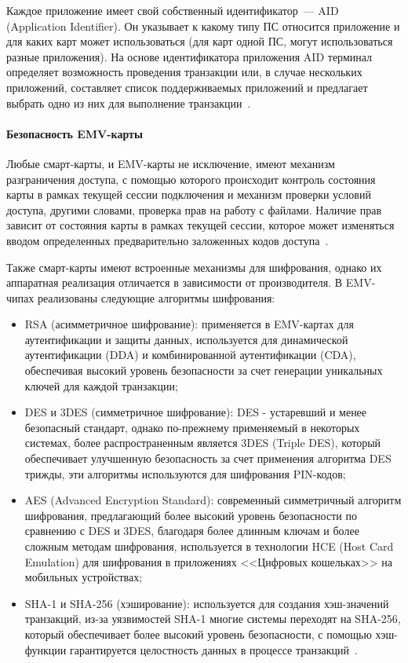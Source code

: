 Каждое приложение имеет свой собственный идентификатор~--- AID (Application Identifier).
Он указывает к какому типу ПС относится приложение и для каких карт может использоваться (для карт одной ПС, могут использоваться разные приложения).
На основе идентификатора приложения AID терминал определяет возможность проведения транзакции или, в случае нескольких приложений, составляет список поддерживаемых приложений и предлагает выбрать одно из них для выполнение транзакции~\cite{emv_card_mechanism}.


\paragraph{Безопасность EMV-карты}

Любые смарт-карты, и EMV-карты не исключение, имеют механизм разграничения доступа, с помощью которого происходит контроль состояния карты в рамках текущей сессии подключения и механизм проверки условий доступа, другими словами, проверка прав на работу с файлами.
Наличие прав зависит от состояния карты в рамках текущей сессии, которое может изменяться вводом определенных предварительно заложенных кодов доступа~\cite{habr_smart_card_for_little}.

Также смарт-карты имеют встроенные механизмы для шифрования, однако их аппаратная реализация отличается в зависимости от производителя.
В EMV-чипах реализованы следующие алгоритмы шифрования:

\begin{itemize}
    \item RSA (асимметричное шифрование): применяется в EMV-картах для аутентификации и защиты данных, используется для динамической аутентификации (DDA) и комбинированной аутентификации (CDA), обеспечивая высокий уровень безопасности за счет генерации уникальных ключей для каждой транзакции;
    \item DES и 3DES (симметричное шифрование): DES - устаревший и менее безопасный стандарт, однако по-прежнему применяемый в некоторых системах, более распространенным является 3DES (Triple DES), который обеспечивает улучшенную безопасность за счет применения алгоритма DES трижды, эти алгоритмы используются для шифрования PIN-кодов;%
    \item AES (Advanced Encryption Standard): современный симметричный алгоритм шифрования, предлагающий более высокий уровень безопасности по сравнению с DES и 3DES, благодаря более длинным ключам и более сложным методам шифрования, используется в технологии HCE (Host Card Emulation) для шифрования в приложениях <<Цифровых кошельках>> на мобильных устройствах;
    \item SHA-1 и SHA-256 (хэширование): используется для создания хэш-значений транзакций, из-за уязвимостей SHA-1 многие системы переходят на SHA-256, который обеспечивает более высокий уровень безопасности, с помощью хэш-функции гарантируется целостность данных в процессе транзакций~\cite{emv_fastercapital}.
\end{itemize}

